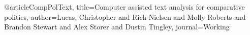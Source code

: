@article{CompPolText,
  title={Computer assisted text analysis for comparative politics},
  author={Lucas, Christopher and Rich Nielsen and Molly Roberts and Brandon Stewart and Alex Storer and Dustin Tingley},
  journal={Working}
}
